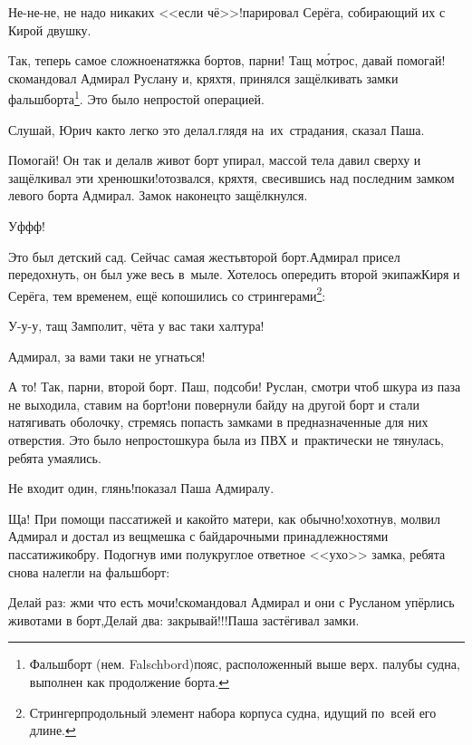 \diagdash Не-не-не, не надо никаких <<если чё>>!\mdash парировал Серёга, собирающий их с Кирой двушку.

\diagdash Так, теперь самое сложное\mdash натяжка бортов, парни! Тащ м\'{о}трос, давай помогай!\mdash скомандовал Адмирал Руслану и, кряхтя, принялся защёлкивать замки фальшборта\footnote{Фальшборт (нем. Falschbord)\mdash пояс, расположенный выше верх. палубы судна, выполнен как продолжение борта\cite{МорскойСправочник}.}. Это было непростой операцией.

\diagdash Слушай, Юрич как\sdash то легко это делал.\mdash глядя на~их~страдания, сказал Паша.

\diagdash Помогай! Он так и делал\mdash в живот борт упирал, массой тела давил сверху и защёлкивал эти хренюшки!\mdash отозвался, кряхтя, свесившись над последним замком левого борта Адмирал. Замок наконец\sdash то защёлкнулся.

\diagdash Уф\sdash ф\sdash ф!

\renewcommand*{\thefootnote}{\fnsymbol{footnote}}
\setcounter{footnote}{0}
\diagdash Это был детский сад. Сейчас самая жесть\mdash второй борт.\mdash Адмирал присел передохнуть, он был уже весь в~мыле. Хотелось опередить второй экипаж\mdash Киря и Серёга, тем временем, ещё копошились со стрингерами\footnote{Стрингер\mdash продольный элемент набора корпуса судна, идущий по~всей его длине\cite{МорскойСправочник}.}: 

\diagdash У-у-у, тащ Замполит, чёта у вас таки халтура!

\diagdash Адмирал, за вами таки не угнаться!

\diagdash А то! Так, парни, второй борт. Паш, подсоби! Руслан, смотри чтоб шкура из паза не выходила, ставим на борт!\mdash они повернули байду на другой борт и стали натягивать оболочку, стремясь попасть замками в предназначенные для них отверстия. Это было непросто\mdash шкура была из ПВХ и~практически не тянулась, ребята умаялись.

\diagdash Не входит один, глянь!\mdash показал Паша Адмиралу.

\diagdash Ща! При помощи пассатижей и какой\sdash то матери, как обычно!\mdash хохотнув, молвил Адмирал и достал из вещмешка с байдарочными принадлежностями пассатижи\sdash кобру. Подогнув ими полукруглое ответное <<ухо>> замка, ребята снова налегли на фальшборт:

\diagdash Делай раз: жми что есть мочи!\mdash скомандовал Адмирал и они с Русланом упёрлись животами в борт,\mdash Делай два: закрывай!!!\mdash Паша застёгивал замки.

